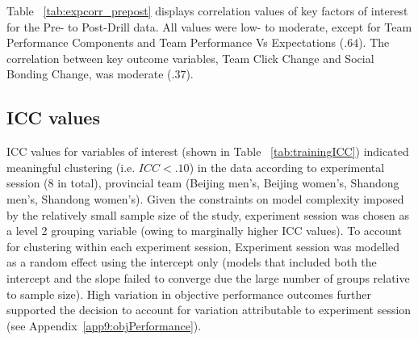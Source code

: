 \begin{CJK}{UTF8}{gbsn}
Table ~\ref{tab:expcorr_prepost} displays correlation values of key factors of interest for the Pre- to Post-Drill data.  All values were low- to moderate, except for Team Performance Components and Team Performance Vs Expectations ($.64$).  The correlation between key outcome variables, Team Click Change and Social Bonding Change, was moderate ($.37$).




\subsection{ICC values}

ICC values for variables of interest (shown in Table ~\ref{tab:trainingICC}) indicated meaningful clustering (i.e. $ICC <.10$) in the data according to experimental session (8 in total), provincial team (Beijing men's, Beijing women's, Shandong men's, Shandong women's).  Given the constraints on model complexity imposed by the relatively small sample size of the study, experiment session was chosen as a level 2 grouping variable (owing to marginally higher ICC values).  To account for clustering within each experiment session, Experiment session was modelled as a random effect using the intercept only (models that included both the intercept and the slope failed to converge due the large number of groups relative to sample size).  High variation in objective performance outcomes further supported the decision to account for variation attributable to experiment session (see Appendix~\ref{app9:objPerformance}).







\end{CJK}
